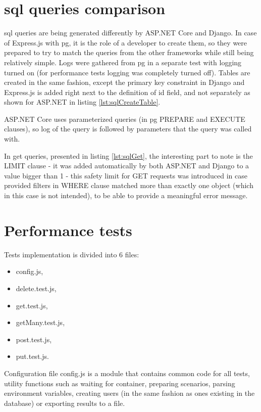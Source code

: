 %
%
\section{\acrshort{sql} queries comparison}
\acrshort{sql} queries are being generated differently by ASP.NET Core and Django. In case of Express.js with \acrlong{pg}, it is the role of a developer to create them, so they were prepared to try to match the queries from the other frameworks while still being relatively simple. Logs were gathered from \acrlong{pg} in a separate test with logging turned on (for performance tests logging was completely turned off).
Tables are created in the same fashion, except the primary key constraint in Django and Express.js is added right next to the definition of id field, and not separately as shown for ASP.NET in listing \ref{lst:sqlCreateTable}.

ASP.NET Core uses parameterized queries (in \acrlong{pg} PREPARE and EXECUTE clauses), so log of the query is followed by parameters that the query was called with.

In get queries, presented in listing \ref{lst:sqlGet}, the interesting part to note is the LIMIT clause - it was added automatically by both ASP.NET and Django to a value bigger than 1 - this safety limit for GET requests was introduced in case provided filters in WHERE clause matched more than exactly one object (which in this case is not intended), to be able to provide a meaningful error message.







%
%
\section{Performance tests}
Tests implementation is divided into 6 files:
\begin{itemize}
    \item config.js,
    \item delete.test.js,
    \item get.test.js,
    \item getMany.test.js,
    \item post.test.js,
    \item put.test.js.
\end{itemize}
Configuration file config.js is a module that contains common code for all tests, utility functions such as waiting for container, preparing scenarios, parsing environment variables, creating users (in the same fashion as ones existing in the database) or exporting results to a file.

